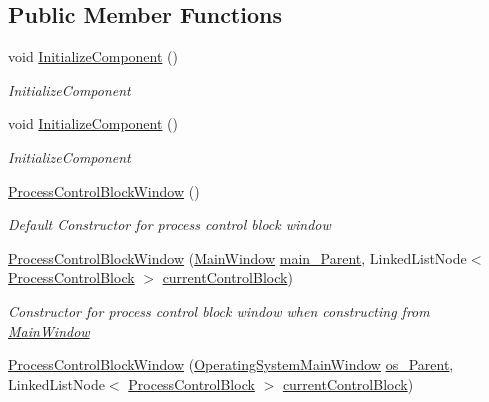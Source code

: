 \subsection*{Public Member Functions}
\begin{DoxyCompactItemize}
\item 
void \hyperlink{class_c_p_u___o_s___simulator_1_1_process_control_block_window_aac333572f064893264da84b178e76404}{Initialize\+Component} ()
\begin{DoxyCompactList}\small\item\em Initialize\+Component \end{DoxyCompactList}\item 
void \hyperlink{class_c_p_u___o_s___simulator_1_1_process_control_block_window_aac333572f064893264da84b178e76404}{Initialize\+Component} ()
\begin{DoxyCompactList}\small\item\em Initialize\+Component \end{DoxyCompactList}\item 
\hyperlink{class_c_p_u___o_s___simulator_1_1_process_control_block_window_afd4e9b7961d1f1c66aa037dba54d39a8}{Process\+Control\+Block\+Window} ()
\begin{DoxyCompactList}\small\item\em Default Constructor for process control block window \end{DoxyCompactList}\item 
\hyperlink{class_c_p_u___o_s___simulator_1_1_process_control_block_window_a4aed66a46265336cfe0cc5293c4e1164}{Process\+Control\+Block\+Window} (\hyperlink{class_c_p_u___o_s___simulator_1_1_main_window}{Main\+Window} \hyperlink{class_c_p_u___o_s___simulator_1_1_process_control_block_window_a928d5159874200e6ca0fad00913d65e5}{main\+\_\+\+Parent}, Linked\+List\+Node$<$ \hyperlink{class_c_p_u___o_s___simulator_1_1_operating___system_1_1_process_control_block}{Process\+Control\+Block} $>$ \hyperlink{class_c_p_u___o_s___simulator_1_1_process_control_block_window_a6019633d26586b0df1c4c2d6f008f6c9}{current\+Control\+Block})
\begin{DoxyCompactList}\small\item\em Constructor for process control block window when constructing from \hyperlink{class_c_p_u___o_s___simulator_1_1_main_window}{Main\+Window} \end{DoxyCompactList}\item 
\hyperlink{class_c_p_u___o_s___simulator_1_1_process_control_block_window_a79535cb1f910910d3cd9d896b7dd9fbc}{Process\+Control\+Block\+Window} (\hyperlink{class_c_p_u___o_s___simulator_1_1_operating_system_main_window}{Operating\+System\+Main\+Window} \hyperlink{class_c_p_u___o_s___simulator_1_1_process_control_block_window_acc4b72c5370a2bcda85b16e0801ce3d9}{os\+\_\+\+Parent}, Linked\+List\+Node$<$ \hyperlink{class_c_p_u___o_s___simulator_1_1_operating___system_1_1_process_control_block}{Process\+Control\+Block} $>$ \hyperlink{class_c_p_u___o_s___simulator_1_1_process_control_block_window_a6019633d26586b0df1c4c2d6f008f6c9}{current\+Control\+Block})

\end{DoxyCompactItemize}
